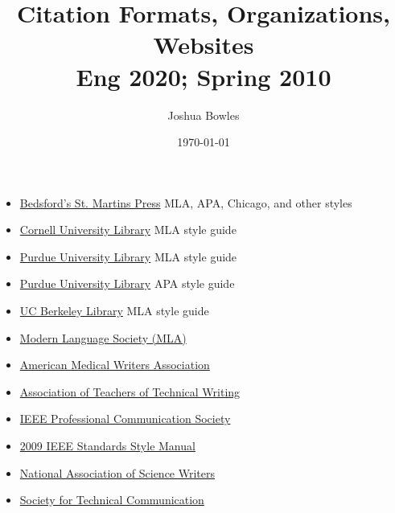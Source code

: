 \documentclass[11pt]{article}
\author{Joshua Bowles}
\title{Citation Formats, Organizations, Websites\\
\small Eng 2020; Spring 2010}
\date{\today}
\begin{document}
\maketitle


\begin{itemize}
\item \href{http://www.bedfordstmartins.com/online/citex.html}{Bedsford's St. Martins Press} MLA, APA, Chicago, 
and other styles 
\item \href{http://www.library.cornell.edu/resrch/citmanage/mla}{Cornell University Library} MLA style guide
\item \href{http://owl.english.purdue.edu/owl/resource/557/01/}{Purdue University Library} MLA style guide
\item \href{http://owl.english.purdue.edu/owl/resource/560/01/}{Purdue University Library} APA style guide
\item \href{http://www.lib.berkeley.edu/instruct/guides/mlastyle.pdf}{UC Berkeley Library} MLA style guide
\item \href{http://languagelog.ldc.upenn.edu/nll/}{Modern Language Society (MLA)}
\item\href{http://www.amwa.org/}{American Medical Writers Association}
\item\href{http://www.attw.org/}{Association of Teachers of Technical Writing}
\item\href{http://www.ieeepcs.org/}{IEEE Professional Communication Society}
\item \href{http://standards.ieee.org/guides/style/2009_Style_Manual.pdf}{2009 IEEE Standards Style Manual}
\item\href{http://nasw.org/}{National Association of Science Writers}
\item\href{http://www.stc.org/}{Society for Technical Communication}
\end{itemize}
\end{document}
